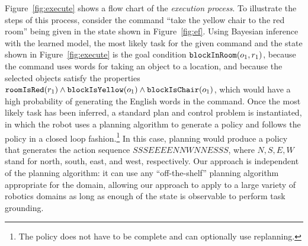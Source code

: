 \documentclass[conference]{IEEEtran}
\begin{document}
Figure~\ref{fig:execute} shows a flow chart of the \emph{execution process}. To illustrate the steps of this process, consider the command ``take the yellow chair to the red room'' being given in the state shown in Figure~\ref{fig:ef}. Using Bayesian inference with the learned model, the most likely task for the given command and the state shown in Figure~\ref{fig:execute} is the goal condition ${\tt blockInRoom}(o_1, r_1)$, because the command uses words for taking an object to a location, and because the selected objects satisfy the properties ${\tt roomIsRed}(r_1) \land {\tt blockIsYellow}(o_1) \land {\tt blockIsChair}(o_1)$, which would have a high probability of generating the English words in the command. Once the most likely task has been inferred, a standard plan and control problem is instantiated, in which the robot uses a planning algorithm to generate a policy and follows the policy in a closed loop fashion.\footnote{The policy does not have to be complete and can optionally use replanning.} In this case, planning would produce a policy that generates the action sequence $SSSEEEENNWNNESSS$, where $N, S, E, W$ stand for north, south, east, and west, respectively. Our approach is independent of the planning algorithm: it can use any ``off-the-shelf'' planning algorithm appropriate for the domain, allowing our approach to apply to a large variety of robotics domains as long as enough of the state is observable to perform task grounding.
\end{document}
